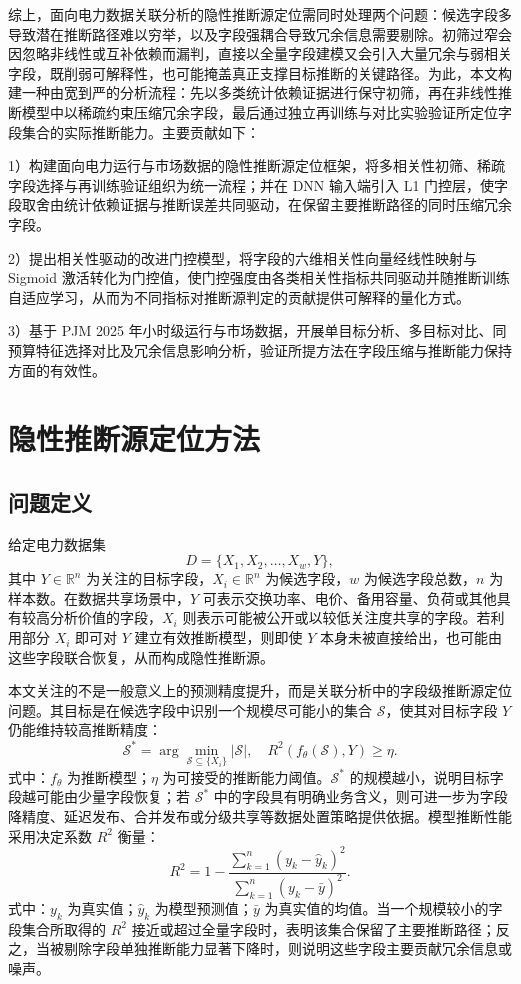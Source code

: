 \documentclass[UTF8,zihao=5,twoside]{ctexart}
\numberwithin{equation}{section}
\begin{document}
综上，面向电力数据关联分析的隐性推断源定位需同时处理两个问题：候选字段多导致潜在推断路径难以穷举，以及字段强耦合导致冗余信息需要剔除。初筛过窄会因忽略非线性或互补依赖而漏判，直接以全量字段建模又会引入大量冗余与弱相关字段，既削弱可解释性，也可能掩盖真正支撑目标推断的关键路径。为此，本文构建一种由宽到严的分析流程：先以多类统计依赖证据进行保守初筛，再在非线性推断模型中以稀疏约束压缩冗余字段，最后通过独立再训练与对比实验验证所定位字段集合的实际推断能力。主要贡献如下：

1）构建面向电力运行与市场数据的隐性推断源定位框架，将多相关性初筛、稀疏字段选择与再训练验证组织为统一流程；并在 DNN 输入端引入 L1 门控层，使字段取舍由统计依赖证据与推断误差共同驱动，在保留主要推断路径的同时压缩冗余字段。

2）提出相关性驱动的改进门控模型，将字段的六维相关性向量经线性映射与 Sigmoid 激活转化为门控值，使门控强度由各类相关性指标共同驱动并随推断训练自适应学习，从而为不同指标对推断源判定的贡献提供可解释的量化方式。

3）基于 PJM 2025 年小时级运行与市场数据，开展单目标分析、多目标对比、同预算特征选择对比及冗余信息影响分析，验证所提方法在字段压缩与推断能力保持方面的有效性。

\section{隐性推断源定位方法}
\subsection{问题定义}
给定电力数据集
\begin{equation}
D=\{X_1,X_2,\ldots,X_w,Y\},
\end{equation}
其中 $Y\in\mathbb{R}^{n}$ 为关注的目标字段，$X_i\in\mathbb{R}^{n}$ 为候选字段，$w$ 为候选字段总数，$n$ 为样本数。在数据共享场景中，$Y$ 可表示交换功率、电价、备用容量、负荷或其他具有较高分析价值的字段，$X_i$ 则表示可能被公开或以较低关注度共享的字段。若利用部分 $X_i$ 即可对 $Y$ 建立有效推断模型，则即使 $Y$ 本身未被直接给出，也可能由这些字段联合恢复，从而构成隐性推断源。

本文关注的不是一般意义上的预测精度提升，而是关联分析中的字段级推断源定位问题。其目标是在候选字段中识别一个规模尽可能小的集合 $\mathcal{S}$，使其对目标字段 $Y$ 仍能维持较高推断精度：
\begin{equation}
\mathcal{S}^{*}=\arg\min_{\mathcal{S}\subseteq \{X_i\}}\left|\mathcal{S}\right|,
\quad
R^2(f_{\theta}(\mathcal{S}),Y)\geq \eta .
\end{equation}
式中：$f_{\theta}$ 为推断模型；$\eta$ 为可接受的推断能力阈值。$\mathcal{S}^{*}$ 的规模越小，说明目标字段越可能由少量字段恢复；若 $\mathcal{S}^{*}$ 中的字段具有明确业务含义，则可进一步为字段降精度、延迟发布、合并发布或分级共享等数据处置策略提供依据。模型推断性能采用决定系数 $R^2$ 衡量：
\begin{equation}
R^2=1-\frac{\sum_{k=1}^{n}(y_k-\hat{y}_k)^2}{\sum_{k=1}^{n}(y_k-\bar{y})^2}.
\end{equation}
式中：$y_k$ 为真实值；$\hat{y}_k$ 为模型预测值；$\bar{y}$ 为真实值的均值。当一个规模较小的字段集合所取得的 $R^2$ 接近或超过全量字段时，表明该集合保留了主要推断路径；反之，当被剔除字段单独推断能力显著下降时，则说明这些字段主要贡献冗余信息或噪声。
\end{document}
